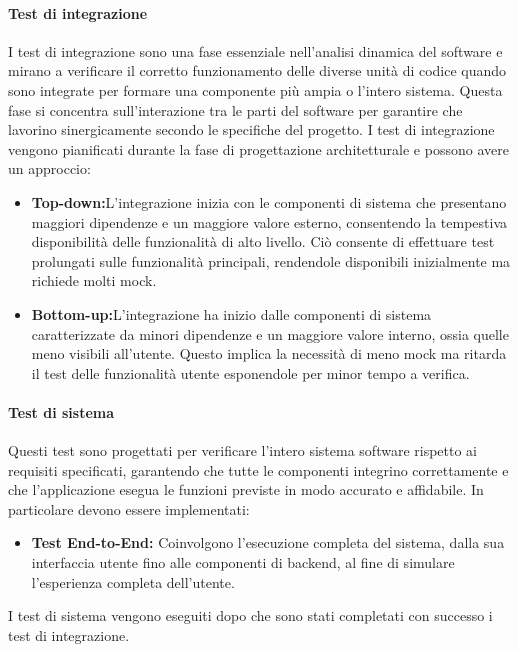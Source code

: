 \paragraph{Test di integrazione}
I test di integrazione sono una fase essenziale nell'analisi dinamica del software e mirano a verificare il corretto funzionamento delle diverse unità di codice quando sono integrate per formare una componente più ampia o l'intero sistema. Questa fase si concentra sull'interazione tra le parti del software per garantire che lavorino sinergicamente secondo le specifiche del progetto.
I test di integrazione vengono pianificati durante la fase di progettazione architetturale e possono avere un approccio:
\begin{itemize}
    \item \textbf{Top-down:}L'integrazione inizia con le componenti di sistema che presentano maggiori dipendenze e un maggiore valore esterno, consentendo la tempestiva disponibilità delle funzionalità di alto livello.
          Ciò consente di effettuare test prolungati sulle funzionalità principali, rendendole disponibili inizialmente ma richiede molti mock.
    \item \textbf{Bottom-up:}L'integrazione ha inizio dalle componenti di sistema caratterizzate da minori dipendenze e un maggiore valore interno, ossia quelle meno visibili all'utente. Questo implica la necessità di meno mock ma ritarda il test delle funzionalità
          utente esponendole per minor tempo a verifica.

\end{itemize}

\paragraph{Test di sistema}
Questi test sono progettati per verificare l'intero sistema software rispetto ai requisiti specificati, garantendo che tutte le componenti integrino correttamente e che l'applicazione esegua le funzioni previste in modo accurato e affidabile.
In particolare devono essere implementati:
\begin{itemize}
    \item  \textbf{Test End-to-End:} Coinvolgono l'esecuzione completa del sistema, dalla sua interfaccia utente fino alle componenti di backend, al fine di simulare l'esperienza completa dell'utente.
\end{itemize}

I test di sistema vengono eseguiti dopo che sono stati completati con successo i test di integrazione.
